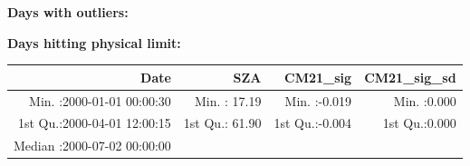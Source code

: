 \documentclass[
  10pt,
  a4paper,oneside]{article}
\begin{document}
\normalsize

\textbf{Days with outliers:}

\textbf{Days hitting physical limit:}

\footnotesize

\begin{longtable}[]{@{}rrrr@{}}
\toprule
\begin{minipage}[b]{0.33\columnwidth}\raggedleft
Date\strut
\end{minipage} & \begin{minipage}[b]{0.19\columnwidth}\raggedleft
SZA\strut
\end{minipage} & \begin{minipage}[b]{0.19\columnwidth}\raggedleft
CM21\_sig\strut
\end{minipage} & \begin{minipage}[b]{0.19\columnwidth}\raggedleft
CM21\_sig\_sd\strut
\end{minipage}\tabularnewline
\midrule
\endhead
\begin{minipage}[t]{0.33\columnwidth}\raggedleft
Min. :2000-01-01 00:00:30\strut
\end{minipage} & \begin{minipage}[t]{0.19\columnwidth}\raggedleft
Min. : 17.19\strut
\end{minipage} & \begin{minipage}[t]{0.19\columnwidth}\raggedleft
Min. :-0.019\strut
\end{minipage} & \begin{minipage}[t]{0.19\columnwidth}\raggedleft
Min. :0.000\strut
\end{minipage}\tabularnewline
\begin{minipage}[t]{0.33\columnwidth}\raggedleft
1st Qu.:2000-04-01 12:00:15\strut
\end{minipage} & \begin{minipage}[t]{0.19\columnwidth}\raggedleft
1st Qu.: 61.90\strut
\end{minipage} & \begin{minipage}[t]{0.19\columnwidth}\raggedleft
1st Qu.:-0.004\strut
\end{minipage} & \begin{minipage}[t]{0.19\columnwidth}\raggedleft
1st Qu.:0.000\strut
\end{minipage}\tabularnewline
\begin{minipage}[t]{0.33\columnwidth}\raggedleft
Median :2000-07-02 00:00:00\strut
\end{minipage} & \begin{minipage}[t]{0.19\columnwidth}\raggedleft

\end{minipage}
\end{longtable}
\end{document}
